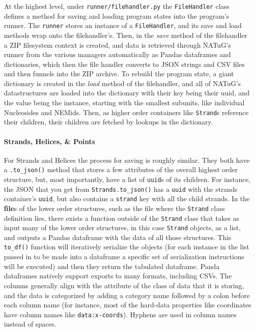 \documentclass[titlepage]{article}
\begin{document}
	At the highest level, under \texttt{runner/filehandler.py} the \texttt{FileHandler} class defines a method for saving and loading program states into the program's runner. The \texttt{runner} stores an instance of a \texttt{FileHandler}, and its save and load methods wrap onto the filehandler's. Then, in the \textit{save} method of the filehandler a ZIP filesystem context is created, and data is retrieved through NATuG's runner from the various managers automatically as Pandas dataframes and dictionaries, which then the file handler converts to JSON strings and CSV files and then funnels into the ZIP archive. To rebuild the program state, a giant dictionary is created in the \textit{load} method of the filehandler, and all of NATuG's datastructures are loaded into the dictionary with their key being their uuid, and the value being the instance, starting with the smallest subunits, like individual Nucleosides and NEMids. Then, as higher order containers like \texttt{Strand}s reference their children, their children are fetched by lookups in the dictionary.
	
	\paragraph{Strands, Helices, \& Points}
	For Strands and Helices the process for saving is roughly similar. They both have a \texttt{.to\_json()} method that stores a few attributes of the overall highest order structure, but, most importantly, have a list of \texttt{uuid}s of its children. For instance, the JSON that you get from \texttt{Strands.to\_json()} has a \texttt{uuid} with the strands container's \texttt{uuid}, but also contains a \texttt{strand} key with all the child strands. In the \textbf{file}s of the lower order structures, such as the file where the \texttt{Strand} class definition lies, there exists a function outside of the \texttt{Strand} class that takes as input many of the lower order structures, in this case \texttt{Strand} objects, as a list, and outputs a Pandas dataframe with the data of all those structures. This \texttt{to\_df()} function will iteratively serialize the objects (for each instance in the list passed in to be made into a dataframe a specific set of serialization instructions will be executed) and then they return the tabulated dataframe. Panda dataframes natively support exports to many formats, including CSVs. The columns generally align with the attribute of the class of data that it is storing, and the data is categorized by adding a category name followed by a colon before each column name (for instance, most of the hard-data properties like coordinates have column names like \texttt{data:x-coords}). Hyphens are used in column names instead of spaces.
	
\end{document}
